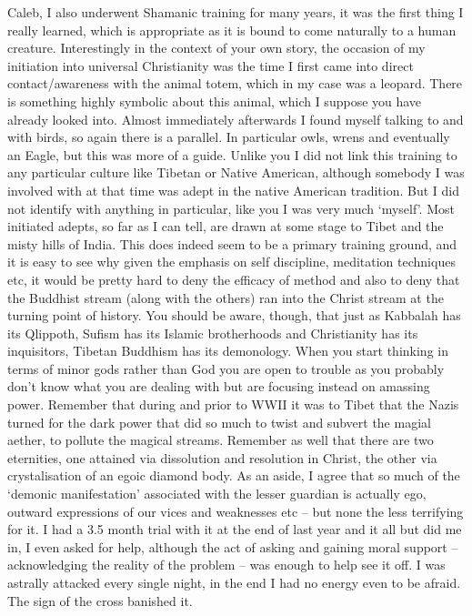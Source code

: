 \begin{footnotesize}
\begin{sffamily}
Caleb, I also underwent Shamanic training for many years, it was the first thing I really learned, which is appropriate as it is bound to come naturally to a human creature. Interestingly in the context of your own story, the occasion of my initiation into universal Christianity was the time I first came into direct contact/awareness with the animal totem, which in my case was a leopard. There is something highly symbolic about this animal, which I suppose you have already looked into. Almost immediately afterwards I found myself talking to and with birds, so again there is a parallel. In particular owls, wrens and eventually an Eagle, but this was more of a guide. Unlike you I did not link this training to any particular culture like Tibetan or Native American, although somebody I was involved with at that time was adept in the native American tradition. But I did not identify with anything in particular, like you I was very much `myself'. Most initiated adepts, so far as I can tell, are drawn at some stage to Tibet and the misty hills of India. This does indeed seem to be a primary training ground, and it is easy to see why given the emphasis on self discipline, meditation techniques etc, it would be pretty hard to deny the efficacy of method and also to deny that the Buddhist stream (along with the others) ran into the Christ stream at the turning point of history. You should be aware, though, that just as Kabbalah has its Qlippoth, Sufism has its Islamic brotherhoods and Christianity has its inquisitors, Tibetan Buddhism has its demonology. When you start thinking in terms of minor gods rather than God you are open to trouble as you probably don't know what you are dealing with but are focusing instead on amassing power. Remember that during and prior to WWII it was to Tibet that the Nazis turned for the dark power that did so much to twist and subvert the magial aether, to pollute the magical streams. Remember as well that there are two eternities, one attained via dissolution and resolution in Christ, the other via crystalisation of an egoic diamond body. As an aside, I agree that so much of the `demonic manifestation' associated with the lesser guardian is actually ego, outward expressions of our vices and weaknesses etc -- but none the less terrifying for it. I had a 3.5 month trial with it at the end of last year and it all but did me in, I even asked for help, although the act of asking and gaining moral support -- acknowledging the reality of the problem -- was enough to help see it off. I was astrally attacked every single night, in the end I had no energy even to be afraid. The sign of the cross banished it.


\end{sffamily}
\end{footnotesize}
